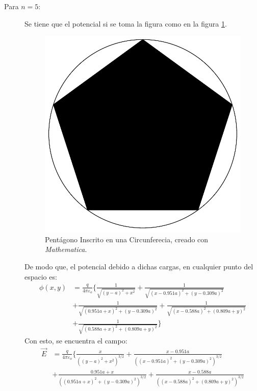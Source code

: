 \begin{mdframed}[style = warning]
\begin{problem}
\begin{description}
			\item[Para $n = 5$: ] Se tiene que el potencial si se toma la figura como en la figura \ref{PP5}.
			\begin{figure}[H]
				\centering
				\includegraphics[scale=0.5]{Images/PentagonP5.pdf}
				\caption{Pentágono Inscrito en una Circunferecia, creado con \textit{Mathematica}.}
				\label{PP5}
			\end{figure}
			De modo que, el potencial debido a dichas cargas, en cualquier punto del espacio es:
				\begin{align*}
					\phi (x,y) &= \frac{q}{4\pi \varepsilon _o} \Bigg\{ \frac{1}{\sqrt{(y-a)^2+x^2}}+\frac{1}{\sqrt{(x-0.951 a)^2+(y-0.309 a)^2}} \\ 
					&+\frac{1}{\sqrt{(0.951 a+x)^2+(y-0.309 a)^2}}+\frac{1}{\sqrt{(x-0.588 a)^2+(0.809 a+y)^2}} \\ 
					&+\frac{1}{\sqrt{(0.588 a+x)^2+(0.809 a+y)^2}} \Bigg\}
				\end{align*}
			Con esto, se encuentra el campo:
				\begin{align*}
					\vec{E} &= \frac{q}{4\pi \varepsilon _o} \Bigg\{ \frac{x}{\left((y-a)^2+x^2\right)^{3/2}}+\frac{x-0.951 a}{\left((x-0.951 a)^2+(y-0.309 a)^2\right)^{3/2}} \\
					&+\frac{0.951 a+x}{\left((0.951 a+x)^2+(y-0.309 a)^2\right)^{3/2}}+\frac{x-0.588 a}{\left((x-0.588 a)^2+(0.809 a+y)^2\right)^{3/2}} \\ 

\end{align*}
\end{description}
\end{problem}
\end{mdframed}
